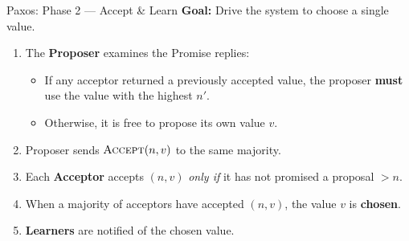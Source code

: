 \begin{frame}{Paxos: Phase 2 --- Accept \& Learn}
\textbf{Goal:} Drive the system to choose a single value.

\vspace{8pt}
\begin{enumerate}
  \item<2-> The \textbf{Proposer} examines the Promise replies:
    \begin{itemize}
      \item If any acceptor returned a previously accepted value, the proposer \textbf{must} use the value with the highest $n'$.
      \item Otherwise, it is free to propose its own value $v$.
    \end{itemize}
  \item<3-> Proposer sends $\textsc{Accept}(n, v)$ to the same majority.
  \item<4-> Each \textbf{Acceptor} accepts $(n, v)$ \emph{only if} it has not promised a proposal $> n$.
  \item<5-> When a majority of acceptors have accepted $(n, v)$, the value $v$ is \textbf{chosen}.
  \item<6-> \textbf{Learners} are notified of the chosen value.
\end{enumerate}

\vspace{6pt}
\end{frame}
